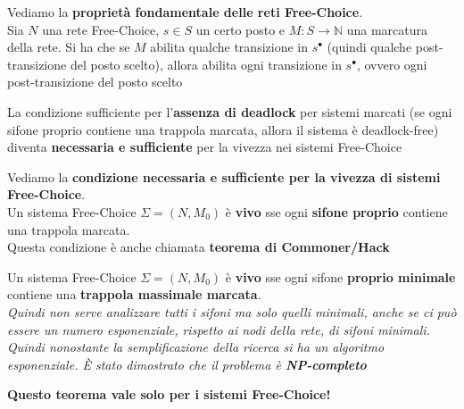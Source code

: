 \documentclass[a4paper,12pt, oneside]{book}
\begin{document}
\newpage
\begin{teorema}
  Vediamo la \textbf{proprietà fondamentale delle reti Free-Choice}.\\
  Sia $N$ una rete Free-Choice, $s \in S $ un certo posto e $M : S\to
  \mathbb{N}$ una marcatura della rete. Si ha che se $M$ abilita qualche
  transizione in $s^\bullet$ (quindi qualche post-transizione del posto scelto),
  allora abilita ogni transizione in $s^\bullet$, ovvero ogni post-transizione
  del posto scelto 
\end{teorema}
La condizione sufficiente per l’\textbf{assenza di deadlock} per sistemi marcati
(se ogni sifone proprio contiene una trappola marcata, allora il sistema è
deadlock-free) diventa\textbf{ necessaria e sufficiente} per la vivezza nei
sistemi Free-Choice 
\begin{teorema}
  Vediamo la \textbf{condizione necessaria e sufficiente per la vivezza di
    sistemi Free-Choice}.\\
  Un sistema Free-Choice $\Sigma=(N,M_0)$ è \textbf{vivo} sse ogni
  \textbf{sifone proprio} contiene una \textnormal{trappola marcata}.\\
  Questa condizione è anche chiamata \textbf{teorema di Commoner/Hack} 
\end{teorema}
\begin{corollario}
  Un sistema Free-Choice $\Sigma=(N,M_0)$ è \textbf{vivo} sse ogni sifone
  \textbf{proprio minimale} contiene una \textbf{trappola massimale marcata}.\\
  \textit{Quindi non serve analizzare tutti i sifoni ma solo quelli minimali,
    anche se ci può essere un numero esponenziale, rispetto ai nodi della rete,
    di sifoni minimali. Quindi nonostante la semplificazione della ricerca si ha
  un algoritmo esponenziale. È stato dimostrato che il problema è
  \textbf{NP-completo}} 
\end{corollario}
\textbf{Questo teorema vale solo per i sistemi Free-Choice!}
\end{document}
